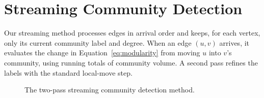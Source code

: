 \chapter{Streaming Community Detection}
\label{ch:streaming}

Our streaming method processes edges in arrival order and keeps, for each vertex, only its
current community label and degree. When an edge $(u, v)$ arrives, it evaluates the change in
Equation~\eqref{eq:modularity} from moving $u$ into $v$'s community, using running totals of
community volume. A second pass refines the labels with the standard local-move step.

\begin{figure}[htbp]
  \centering
  \caption{The two-pass streaming community detection method.}
  \label{fig:stream}
\end{figure}

